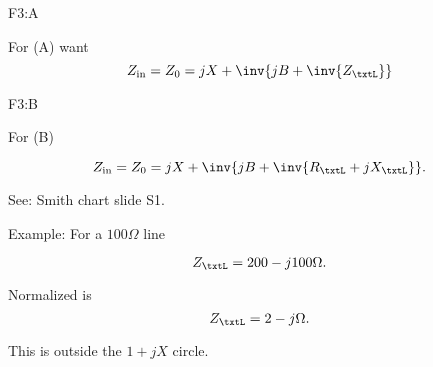 F3:A

For (A) want
\begin{equation}\label{eqn:uwavesDeck6LCmatchingCore:180}
Z_{\textrm{in}} = Z_0 = j X + \inv{ j B + \inv{Z_\txtL} }
\end{equation}

F3:B

For (B)

\begin{equation}\label{eqn:uwavesDeck6LCmatchingCore:200}
Z_{\textrm{in}} = Z_0 = j X + \inv{ j B + \inv{R_\txtL + j X_\txtL} }.
\end{equation}

See: Smith chart slide S1.

Example: For a \( 100 \Omega \) line

\begin{equation}\label{eqn:uwavesDeck6LCmatchingCore:220}
Z_\txtL = 200 -j 100 \Omega.
\end{equation}

Normalized is
\begin{equation}\label{eqn:uwavesDeck6LCmatchingCore:240}
Z_\txtL = 2 -j \Omega.
\end{equation}

This is outside the \( 1 + j X \) circle.
